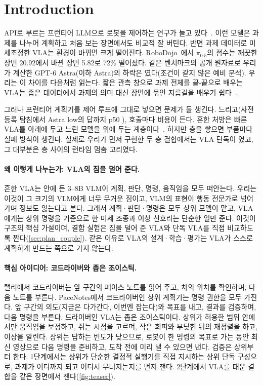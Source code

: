 \section{Introduction}
\label{sec:intro}

API로 부르는 프런티어 LLM으로 로봇을 제어하는 연구가 늘고 있다~\cite{agp2026,robodojo2026,su2026astra}. 이런 모델은 과제를 나누어 계획하고 처음 보는 장면에서도 비교적 잘 버틴다. 반면 과제 데이터로 미세조정한 VLA는 환경이 바뀌면 크게 떨어진다. RoboDojo~\cite{robodojobench2026}에서 $\pi_{0.5}$의 점수는 깨끗한 장면 20.92에서 바뀐 장면 5.82로 72\% 떨어졌다. 같은 벤치마크의 공개 원자료로 우리가 계산한 GPT-6 Astra(이하 Astra)의 하락은 였다(조건이 같지 않은 예비 분석). 우리는 이 차이를 다음처럼 읽는다. 짧은 관측 창으로 과제 전체를 끝-끝으로 배우는 VLA는 좁은 데이터에서 과제의 의미 대신 장면에 묶인 지름길을 배우기 쉽다~\cite{shortcut2025,liberoplus2025}.

그러나 프런티어 계획기를 제어 루프에 그대로 넣으면 문제가 둘 생긴다. 느리고(사전 등록 탐침에서 Astra low의 답까지 p50 ), 호출마다 비용이 든다. 흔한 처방은 빠른 VLA를 아래에 두고 느린 모델을 위에 두는 계층이다~\cite{geminirobotics15_2025,pi05_2025,hirobot2025}. 하지만 층을 쌓으면 부품마다 실패 방식이 생긴다. 실제로 우리가 먼저 구현한 두 층 결합에서는 VLA 단독이 였고, 그 대부분은 층 사이의 런타임 멈춤 고리였다.

\paragraph{왜 이렇게 나누는가: VLA의 짐을 덜어 준다.} 흔한 VLA는 안에 든 3--8B VLM이 계획, 판단, 명령, 움직임을 모두 떠안는다. 우리는 이것이 그 크기의 VLM에게 너무 무거운 짐이고, VLM의 표현이 행동 전문가로 넘어가며 정보도 잃는다고 본다. 그래서 계획·판단·명령은 모두 상위 모델이 맡고, VLA에게는 상위 명령을 기준으로 한 미세 조종과 이상 신호라는 단순한 일만 준다.  이것이 구조의 핵심 가설이며, 결합 실험은 짐을 덜어 준 VLA와 단독 VLA를 직접 비교하도록 짠다(\cref{sec:plan_couple}). 같은 이유로 VLA의 설계·학습·평가는 VLA가 스스로 계획하게 만드는 쪽으로 가지 않는다.

\paragraph{핵심 아이디어: 코드라이버와 좁은 조이스틱.} 랠리에서 코드라이버는 앞 구간의 페이스 노트를 읽어 주고, 차의 위치를 확인하며, 다음 노트를 부른다. PaceNotes에서 코드라이버인 상위 계획기는 명령 권한을 모두 가진다. 앞 구간의 의도(지금은 다가간다, 이번엔 잡는다)와 목표를 내고, 결과를 검증하며, 다음 명령을 부른다. 드라이버인 VLA는 좁은 조이스틱이다. 상위가 허용한 범위 안에서만 움직임을 보정하고, 쥐는 시점을 고르며, 작은 회피와 부딪힌 뒤의 재정렬을 하고, 이상을 알린다. 상위는 답하는 빈도가 낮으므로, 로봇이 한 명령의 목표로 가는 동안 최신 영상으로 다음 명령을 준비하고, 도착 전에 미리 낼 수 있으면 낸다. 검증은 상위부터 한다. 1단계에서는 상위가 단순한 결정적 실행기를 직접 지시하는 상위 단독 구성으로, 과제가 어디까지 되고 어디서 무너지는지를 먼저 잰다. 2단계에서 VLA를 태운 결합을 같은 장면에서 잰다(\cref{fig:teaser}).

